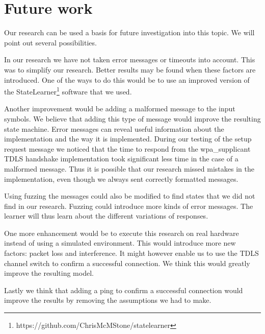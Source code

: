 \chapter{Future work}
\label{futurework}

Our research can be used a basis for future investigation into this topic. We will point out several possibilities.

In our research we have not taken error messages or timeouts into account. This was to simplify our research. Better results may be found when these factors are introduced. One of the ways to do this would be to use an improved version of the StateLearner\footnote{https://github.com/ChrisMcMStone/statelearner} software that we used. 

Another improvement would be adding a malformed message to the input symbols. We believe that adding this type of message would improve the resulting state machine. Error messages can reveal useful information about the implementation and the way it is implemented. During our testing of the setup request message we noticed that the time to respond from the wpa\_supplicant TDLS handshake implementation took significant less time in the case of a malformed message. Thus it is possible that our research missed mistakes in the implementation, even though we always sent correctly formatted messages.

Using fuzzing the messages could also be modified to find states that we did not find in our research. Fuzzing could introduce more kinds of error messages. The learner will thus learn about the different variations of responses.

One more enhancement would be to execute this research on real hardware instead of using a simulated environment. This would introduce more new factors: packet loss and interference. It might however enable us to use the TDLS channel switch to confirm a successful connection. We think this would greatly improve the resulting model.

Lastly we think that adding a ping to confirm a successful connection would improve the results by removing the assumptions we had to make.

